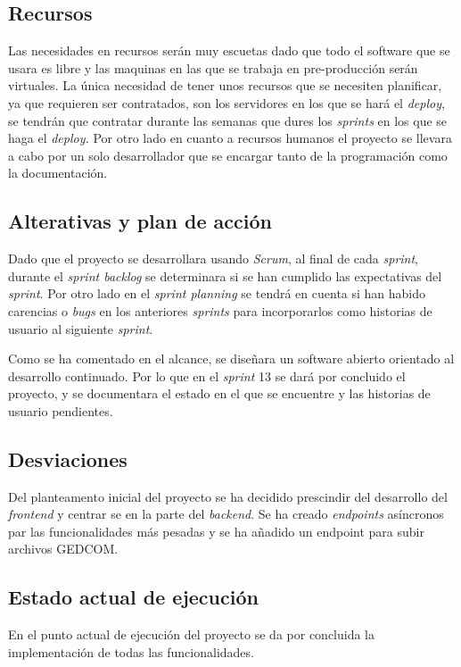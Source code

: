 \documentclass[12pt]{article} %
\begin{document}
\subsection{Recursos}
Las necesidades en recursos serán muy escuetas dado que todo el software que se usara es libre y las maquinas en las que se trabaja en pre-producción serán virtuales. La única necesidad de tener unos recursos que se necesiten planificar, ya que requieren ser contratados, son los servidores en los que se hará el \textit{deploy}, se tendrán que contratar durante las semanas que dures los \textit{sprints} en los que se haga el \textit{deploy.} Por otro lado en cuanto a recursos humanos el proyecto se llevara a cabo por un solo desarrollador que se encargar tanto de la programación como la documentación.

\subsection{Alterativas y plan de acción}
Dado que el proyecto se desarrollara usando \textit{Scrum}, al final de cada \textit{sprint}, durante el \textit{sprint backlog} se determinara si se han cumplido las expectativas del \textit{sprint}. Por otro lado en el \textit{sprint planning} se tendrá en cuenta si han habido carencias o \textit{bugs} en los anteriores \textit{sprints} para incorporarlos como historias de usuario al siguiente \textit{sprint}. 

Como se ha comentado en el alcance, se diseñara un software abierto orientado al desarrollo continuado. Por lo que en el \textit{sprint} 13 se dará por concluido el proyecto, y se documentara el estado en el que se encuentre y las historias de usuario pendientes.
\newpage

\subsection{Desviaciones}
Del planteamento inicial del proyecto se ha decidido prescindir del desarrollo del \textit{frontend} y centrar se en la parte del \textit{backend}. Se ha creado \textit{endpoints} asíncronos par las funcionalidades más pesadas y se ha añadido un endpoint para subir archivos GEDCOM.

\subsection{Estado actual de ejecución}
En el punto actual de ejecución del proyecto se da por concluida la implementación de todas las funcionalidades.
\end{document}
